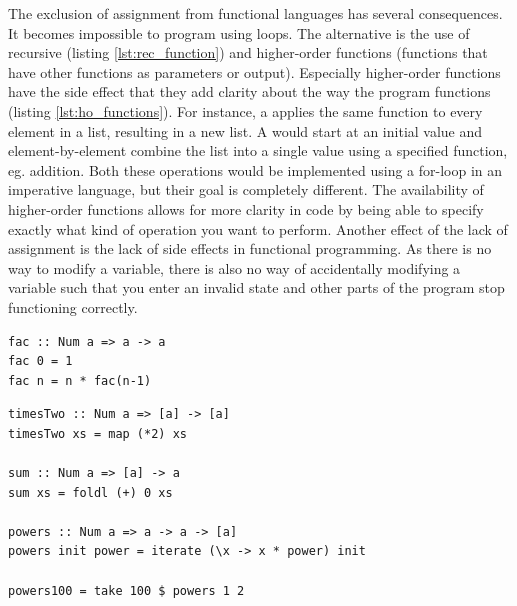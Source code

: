 The exclusion of assignment from functional languages has several consequences. It becomes impossible to program using loops. The alternative is the use of recursive (listing \ref{lst:rec_function}) and higher-order functions (functions that have other functions as parameters or output). Especially higher-order functions have the side effect that they add clarity about the way the program functions (listing \ref{lst:ho_functions}). For instance, a  applies the same function to every element in a list, resulting in a new list. A  would start at an initial value and element-by-element combine the list into a single value using a specified function, eg. addition. Both these operations would be implemented using a for-loop in an imperative language, but their goal is completely different. The availability of higher-order functions allows for more clarity in code by being able to specify exactly what kind of operation you want to perform. Another effect of the lack of assignment is the lack of side effects in functional programming. As there is no way to modify a variable, there is also no way of accidentally modifying a variable such that you enter an invalid state and other parts of the program stop functioning correctly.

\begin{lstlisting}[caption=Recursive functions, label=lst:rec_function]
fac :: Num a => a -> a
fac 0 = 1
fac n = n * fac(n-1)
\end{lstlisting}

\begin{lstlisting}[caption=Higher order functions, label=lst:ho_functions]
timesTwo :: Num a => [a] -> [a]
timesTwo xs = map (*2) xs

sum :: Num a => [a] -> a
sum xs = foldl (+) 0 xs

powers :: Num a => a -> a -> [a]
powers init power = iterate (\x -> x * power) init

powers100 = take 100 $ powers 1 2
\end{lstlisting}

